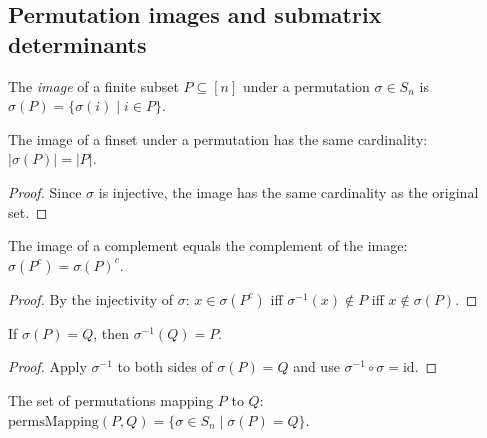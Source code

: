 \subsection{Permutation images and submatrix determinants}

\begin{definition}
\label{def.det.imageFinset}
\leanhelper
\leanok
The \emph{image} of a finite subset $P \subseteq [n]$ under a permutation
$\sigma \in S_n$ is $\sigma(P) = \{\sigma(i) \mid i \in P\}$.
\end{definition}

\begin{lemma}
\label{lem.det.imageFinset-card}
\leanhelper
\leanok
The image of a finset under a permutation has the same cardinality:
$|\sigma(P)| = |P|$.
\end{lemma}

\begin{proof}
\leanok
Since $\sigma$ is injective, the image has the same cardinality as the original set.
\end{proof}

\begin{lemma}
\label{lem.det.imageFinset-compl}
\leanhelper
\leanok
The image of a complement equals the complement of the image:
$\sigma(P^c) = \sigma(P)^c$.
\end{lemma}

\begin{proof}
\leanok
By the injectivity of $\sigma$: $x \in \sigma(P^c)$ iff $\sigma^{-1}(x) \notin P$
iff $x \notin \sigma(P)$.
\end{proof}

\begin{lemma}
\label{lem.det.imageFinset-inv}
\leanhelper
\leanok
If $\sigma(P) = Q$, then $\sigma^{-1}(Q) = P$.
\end{lemma}

\begin{proof}
\leanok
Apply $\sigma^{-1}$ to both sides of $\sigma(P) = Q$ and use
$\sigma^{-1} \circ \sigma = \mathrm{id}$.
\end{proof}

\begin{definition}
\label{def.det.permsMapping}
\leanhelper
\leanok
The set of permutations mapping $P$ to $Q$:
$\mathrm{permsMapping}(P, Q) = \{\sigma \in S_n \mid \sigma(P) = Q\}$.
\end{definition}

